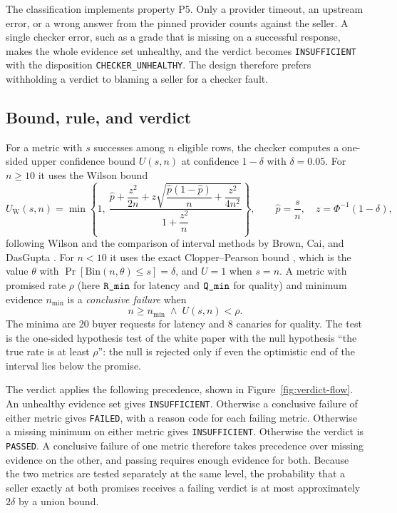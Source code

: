 The classification implements property P5. Only a provider timeout, an upstream
error, or a wrong answer from the pinned provider counts against the seller.
A single checker error, such as a grade that is missing on a successful
response, makes the whole evidence set unhealthy, and the verdict becomes
\texttt{INSUFFICIENT} with the disposition \texttt{CHECKER\_UNHEALTHY}. The
design therefore prefers withholding a verdict to blaming a seller for a
checker fault.

\subsection{Bound, rule, and verdict}
\label{sec:verdict_rule}

For a metric with $s$ successes among $n$ eligible rows, the checker computes a
one-sided upper confidence bound $U(s, n)$ at confidence $1-\delta$ with
$\delta = 0.05$. For $n \geq 10$ it uses the Wilson bound
\begin{equation}
  \label{eq:wilson}
  U_{\text{W}}(s, n) = \min\!\left\{1,\
  \frac{\hat p + \dfrac{z^2}{2n} + z\sqrt{\dfrac{\hat p(1-\hat p)}{n} +
  \dfrac{z^2}{4n^2}}}{1 + \dfrac{z^2}{n}}\right\},
  \qquad \hat p = \frac{s}{n},\quad z = \Phi^{-1}(1-\delta),
\end{equation}
following Wilson \cite{wilson1927} and the comparison of interval methods by
Brown, Cai, and DasGupta \cite{brown2001}. For $n < 10$ it uses the exact
Clopper--Pearson bound \cite{clopper1934}, which is the value $\theta$ with
$\Pr[\mathrm{Bin}(n, \theta) \leq s] = \delta$, and $U = 1$ when $s = n$. A metric with promised rate $\rho$ (here
$\textnormal{\texttt{R\_min}}$ for latency and $\textnormal{\texttt{Q\_min}}$ for quality) and minimum evidence
$n_{\min}$ is a \emph{conclusive failure} when
\begin{equation}
  \label{eq:conclusive_failure}
  n \geq n_{\min} \;\wedge\; U(s, n) < \rho.
\end{equation}
The minima are 20 buyer requests for latency and 8 canaries for quality. The
test is the one-sided hypothesis test of the white paper with the null
hypothesis ``the true rate is at least $\rho$'': the null is rejected only if
even the optimistic end of the interval lies below the promise.

The verdict applies the following precedence, shown in
Figure~\ref{fig:verdict-flow}. An unhealthy evidence set gives
\texttt{INSUFFICIENT}. Otherwise a conclusive failure of either metric gives
\texttt{FAILED}, with a reason code for each failing metric. Otherwise a missing
minimum on either metric gives \texttt{INSUFFICIENT}. Otherwise the verdict is
\texttt{PASSED}. A conclusive failure of one metric therefore takes precedence
over missing evidence on the other, and passing requires enough evidence for
both. Because the two metrics are tested separately at the same
level, the probability that a seller exactly at both promises receives a
failing verdict is at most approximately $2\delta$ by a union bound.

